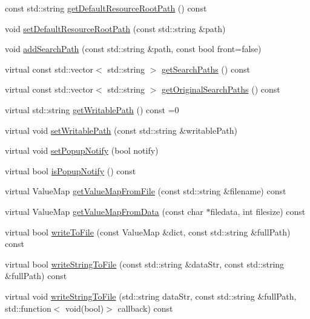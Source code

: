 \begin{DoxyCompactItemize}
const std\+::string \hyperlink{classFileUtils_ad7be12b938a4aab370beef6dcb553a1d}{get\+Default\+Resource\+Root\+Path} () const
\item 
void \hyperlink{classFileUtils_a286cf8c14b4bf393e492ba0e3411ec06}{set\+Default\+Resource\+Root\+Path} (const std\+::string \&path)
\item 
void \hyperlink{classFileUtils_a690dab9554f2976e2d5ae0a6322e245d}{add\+Search\+Path} (const std\+::string \&path, const bool front=false)
\item 
virtual const std\+::vector$<$ std\+::string $>$ \hyperlink{classFileUtils_a11610172e9e0ca8379c6574ed2433a8c}{get\+Search\+Paths} () const
\item 
virtual const std\+::vector$<$ std\+::string $>$ \hyperlink{classFileUtils_a43670a0b6631730400ada9ca283bcc80}{get\+Original\+Search\+Paths} () const
\item 
virtual std\+::string \hyperlink{classFileUtils_aab14c8d4e292f7a1e9b2b2908d02a0ed}{get\+Writable\+Path} () const =0
\item 
virtual void \hyperlink{classFileUtils_a198fe2619bd2bf551efeccf6010268b0}{set\+Writable\+Path} (const std\+::string \&writable\+Path)
\item 
virtual void \hyperlink{classFileUtils_a3763086a2f23fd47fc3ba77c56ab38a8}{set\+Popup\+Notify} (bool notify)
\item 
virtual bool \hyperlink{classFileUtils_a969a59acf14d03cf424d20f31d709d9c}{is\+Popup\+Notify} () const
\item 
virtual Value\+Map \hyperlink{classFileUtils_a7a5c18baa7c28962d642c101513c7c1b}{get\+Value\+Map\+From\+File} (const std\+::string \&filename) const
\item 
virtual Value\+Map \hyperlink{classFileUtils_a9c882af1acde6d249e35713e82b53607}{get\+Value\+Map\+From\+Data} (const char $\ast$filedata, int filesize) const
\item 
virtual bool \hyperlink{classFileUtils_aaf55e6d080352b5fec3924521ab553e2}{write\+To\+File} (const Value\+Map \&dict, const std\+::string \&full\+Path) const
\item 
virtual bool \hyperlink{classFileUtils_a0936e63c5225388250ff3dce11a5cc78}{write\+String\+To\+File} (const std\+::string \&data\+Str, const std\+::string \&full\+Path) const
\item 
virtual void \hyperlink{classFileUtils_a053cc5146cc3a8aca08699f6707f8883}{write\+String\+To\+File} (std\+::string data\+Str, const std\+::string \&full\+Path, std\+::function$<$ void(bool)$>$ callback) const
\item 

\end{DoxyCompactItemize}
